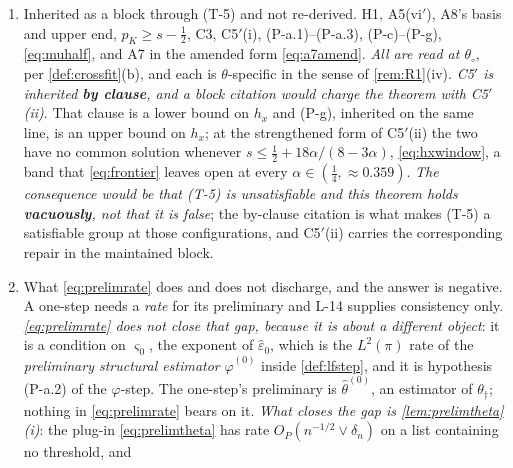 \begin{remark}
\begin{enumerate}
nonsingularity \cref{lem:sandwich}(i) Step~6 needs is A1b(iv)'s, listed in (T-1).
\item[(3)] Inherited as a block through (T-5) and not re-derived. H1, A5(vi$'$), A8's basis and
upper end, $p_K\ge s-\tfrac12$, C3, C5$'$(i), (P-a.1)--(P-a.3), (P-c)--(P-g), \eqref{eq:muhalf}, and A7 in the
amended form \eqref{eq:a7amend}. \emph{All are read at $\theta_\circ$}, per \cref{def:crossfit}(b), and each
is $\theta$-specific in the sense of \cref{rem:R1}\textup{(iv)}.
\emph{C5$'$ is inherited \textbf{by clause}, and a block citation would charge the theorem with
C5$'$(ii)}. That clause is a lower bound on $h_x$ and (P-g),
inherited on the same line, is an upper bound on $h_x$; at the strengthened form of C5$'$(ii) the two have no
common solution whenever $s\le\tfrac12+18\alpha/(8-3\alpha)$, \eqref{eq:hxwindow}, a band that
\eqref{eq:frontier} leaves open at every $\alpha\in(\tfrac14,\approx0.359)$. \emph{The consequence would be
that (T-5) is unsatisfiable and this theorem holds \textbf{vacuously}, not that it is false}; the by-clause
citation is what makes (T-5) a satisfiable group at those configurations, and C5$'$(ii) carries the
corresponding repair in the maintained block.
\item[(4)] What \eqref{eq:prelimrate} does and does not discharge, and the answer is negative. A
one-step needs a \emph{rate} for its
preliminary and L-14 supplies consistency only. \emph{\eqref{eq:prelimrate} does not close that gap,
because it is about a different object}: it is a condition on $\varsigma_0$, the exponent of
$\hat\varepsilon_0$, which is the $L^{2}(\pi)$ rate of the \emph{preliminary structural estimator}
$\hat\varphi^{(0)}$ inside \cref{def:lfstep}, and it is hypothesis (P-a.2) of the $\varphi$-step. The
one-step's preliminary is $\hat\theta^{(0)}$, an estimator of $\theta_\dagger$; nothing in
\eqref{eq:prelimrate} bears on it. \emph{What closes the gap is \cref{lem:prelimtheta}\textup{(i)}}: the
plug-in \eqref{eq:prelimtheta} has rate $O_P(n^{-1/2}\vee\delta_n)$ on a list containing no threshold, and

\end{enumerate}
\end{remark}

